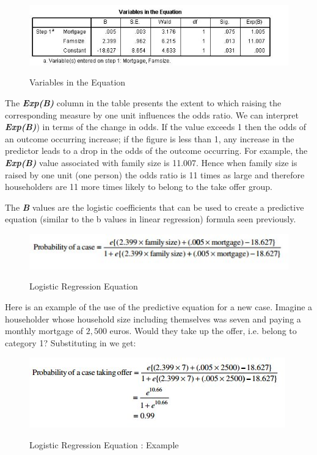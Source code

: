 \documentclass[a4paper,12pt]{article}
\begin{document}
\begin{figure}
\begin{center}
  \includegraphics[scale=0.6]{images/Logistic8}\\
  \caption{Variables in the Equation}
\end{center}
\end{figure}

The \textbf{\textit{Exp(B)}} column in the table presents the extent to which raising the corresponding measure by one unit influences the odds ratio. We can interpret \textbf{\textit{Exp(B)}}) in
terms of the change in odds. If the value exceeds 1 then the odds of an outcome occurring increase; if the figure is less than 1, any increase in the predictor leads to a drop in
the odds of the outcome occurring. For example, the \textbf{\textit{Exp(B)}} value associated with
family size is 11.007. Hence when family size is raised by one unit (one person) the
odds ratio is 11 times as large and therefore householders are 11 more times likely to
belong to the take offer group.

The \textbf{\textit{B}} values are the logistic coefficients that can be used to create a predictive
equation (similar to the b values in linear regression) formula seen previously.
\begin{figure}
\begin{center}
  \includegraphics[scale=0.75]{images/Logistic11}\\
  \caption{Logistic Regression Equation}
\end{center}
\end{figure}

Here is an example of the use of the predictive equation for a new case. Imagine a
householder whose household size including themselves was seven and paying
a monthly mortgage of $2,500$ euros. Would they take up the offer, i.e. belong to category 1?
Substituting in we get:
\begin{figure}
\begin{center}
  \includegraphics[scale=0.75]{images/Logistic12}\\
  \caption{Logistic Regression Equation : Example}
\end{center}
\end{figure}
\end{document}
